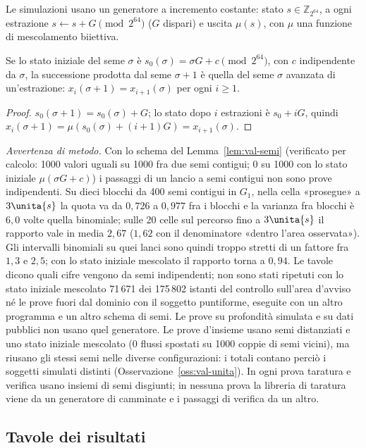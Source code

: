 Le simulazioni usano un generatore a incremento costante: stato $s\in\mathbb Z_{2^{64}}$, a ogni estrazione $s\leftarrow s+G\pmod{2^{64}}$ ($G$ dispari) e uscita $\mu(s)$, con $\mu$ una funzione di mescolamento biiettiva.

\begin{lemma}\label{lem:val-semi}
Se lo stato iniziale del seme $\sigma$ è $s_0(\sigma)=\sigma G+c\pmod{2^{64}}$, con $c$ indipendente da $\sigma$, la successione prodotta dal seme $\sigma+1$ è quella del seme $\sigma$ avanzata di un'estrazione: $x_i(\sigma+1)=x_{i+1}(\sigma)$ per ogni $i\ge1$. 
\end{lemma}
\begin{proof}
$s_0(\sigma+1)=s_0(\sigma)+G$; lo stato dopo $i$ estrazioni è $s_0+iG$, quindi $x_i(\sigma+1)=\mu(s_0(\sigma)+(i+1)G)=x_{i+1}(\sigma)$.
\end{proof}
\emph{Avvertenza di metodo.} Con lo schema del Lemma~\ref{lem:val-semi} (verificato per calcolo: 1000 valori uguali su 1000 fra due semi contigui; 0 su 1000 con lo stato iniziale $\mu(\sigma G+c)$) i passaggi di un lancio a semi contigui non sono prove indipendenti. Su dieci blocchi da 400 semi contigui in $G_1$, nella cella «prosegue» a $3\unita{s}$ la quota va da $0{,}726$ a $0{,}977$ fra i blocchi e la varianza fra blocchi è $6{,}0$ volte quella binomiale; sulle 20 celle sul percorso fino a $3\unita{s}$ il rapporto vale in media $2{,}67$ ($1{,}62$ con il denominatore «dentro l'area osservata»). Gli intervalli binomiali su quei lanci sono quindi troppo stretti di un fattore fra $1{,}3$ e $2{,}5$; con lo stato iniziale mescolato il rapporto torna a $0{,}94$. Le tavole dicono quali cifre vengono da semi indipendenti; non sono stati ripetuti con lo stato iniziale mescolato 71\,671 dei 175\,802 istanti del controllo sull'area d'avviso né le prove fuori dal dominio con il soggetto puntiforme, eseguite con un altro programma e un altro schema di semi. Le prove su profondità simulata e su dati pubblici non usano quel generatore. Le prove d'insieme usano semi distanziati e uno stato iniziale mescolato (0 flussi spostati su 1000 coppie di semi vicini), ma riusano gli stessi semi nelle diverse configurazioni: i totali contano perciò i soggetti simulati distinti (Osservazione~\ref{oss:val-unita}). In ogni prova taratura e verifica usano insiemi di semi disgiunti; in nessuna prova la libreria di taratura viene da un generatore di camminate e i passaggi di verifica da un altro.

\subsection{Tavole dei risultati}\label{sec:val-tavole}

